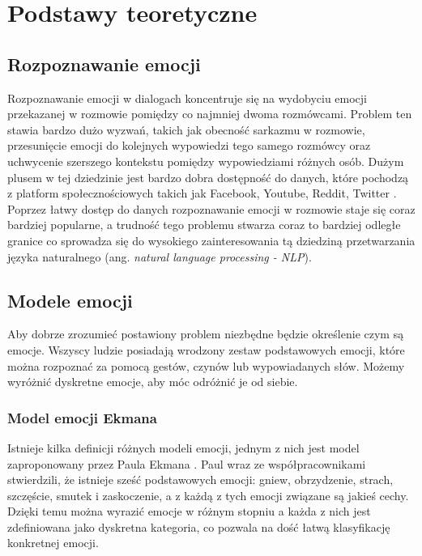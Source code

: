 \chapter{Podstawy teoretyczne}

\section{Rozpoznawanie emocji}

Rozpoznawanie emocji w dialogach koncentruje się na wydobyciu emocji przekazanej w rozmowie pomiędzy co najmniej dwoma rozmówcami. Problem ten stawia bardzo dużo wyzwań, takich jak obecność sarkazmu w rozmowie, przesunięcie emocji do kolejnych wypowiedzi tego samego rozmówcy oraz uchwycenie szerszego kontekstu pomiędzy wypowiedziami różnych osób. Dużym plusem w tej dziedzinie jest bardzo dobra dostępność do danych, które pochodzą z platform społecznościowych takich jak Facebook, Youtube, Reddit, Twitter \cite{poria2019emotion}. Poprzez łatwy dostęp do danych rozpoznawanie emocji w rozmowie staje się coraz bardziej popularne, a trudność tego problemu stwarza coraz to bardziej odległe granice co sprowadza się do wysokiego zainteresowania tą dziedziną przetwarzania języka naturalnego (ang. \textit{natural language processing - NLP}).

\section{Modele emocji}

Aby dobrze zrozumieć postawiony problem niezbędne będzie określenie czym są emocje. Wszyscy ludzie posiadają wrodzony zestaw podstawowych emocji, które można rozpoznać za pomocą gestów, czynów lub wypowiadanych słów. Możemy wyróżnić dyskretne emocje, aby móc odróżnić je od siebie.

\subsection{Model emocji Ekmana}

Istnieje kilka definicji różnych modeli emocji, jednym z nich jest model zaproponowany przez Paula Ekmana \cite{ekman1993facial}. Paul wraz ze współpracownikami stwierdzili, że istnieje sześć podstawowych emocji: gniew, obrzydzenie, strach, szczęście, smutek i zaskoczenie, a z każdą z tych emocji związane są jakieś cechy. Dzięki temu można wyrazić emocje w różnym stopniu a każda z nich jest zdefiniowana jako dyskretna kategoria, co pozwala na dość łatwą klasyfikację konkretnej emocji.

